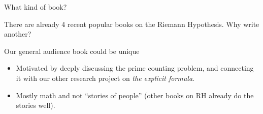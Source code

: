 \documentclass{beamer}
\begin{document}
\begin{frame}{What kind of book?}

  There are already 4 recent popular books on the Riemann Hypothesis.  Why write another?
  \vfill

  \begin{block}{Our general audience book could be unique}
    \begin{itemize}
      \item Motivated by deeply discussing the prime counting problem, and connecting it with our other research project on {\em the explicit formula}.
      \item Mostly math and not ``stories of people'' (other books on RH already do the stories well).
    \end{itemize}
  \end{block}
\end{frame}
\end{document}

